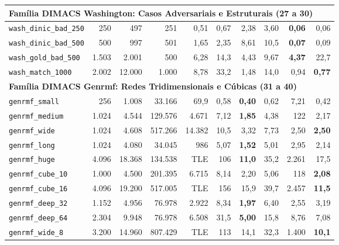 \begin{longtable}{lrrrrrrrrr}
\midrule
\multicolumn{10}{l}{\textbf{Família DIMACS Washington: Casos Adversariais e Estruturais (27 a 30)}} \\
\midrule
\texttt{wash\_dinic\_bad\_250} & 250 & 497 & 251 & 0,51 & 0,67 & 2,38 & 3,60 & \textbf{0,06} & 0,06 \\
\texttt{wash\_dinic\_bad\_500} & 500 & 997 & 501 & 1,65 & 2,35 & 8,61 & 10,5 & \textbf{0,07} & 0,09 \\
\texttt{wash\_gold\_bad\_500} & 1.503 & 2.001 & 500 & 6,28 & 14,3 & 4,43 & 9,67 & \textbf{4,37} & 22,7 \\
\texttt{wash\_match\_1000} & 2.002 & 12.000 & 1.000 & 8,78 & 33,2 & 1,48 & 14,0 & 0,94 & \textbf{0,77} \\
\midrule
\multicolumn{10}{l}{\textbf{Família DIMACS Genrmf: Redes Tridimensionais e Cúbicas (31 a 40)}} \\
\midrule
\texttt{genrmf\_small} & 256 & 1.008 & 33.166 & 69,9 & 0,58 & \textbf{0,40} & 0,62 & 7,21 & 0,42 \\
\texttt{genrmf\_medium} & 1.024 & 4.544 & 129.576 & 4.671 & 7,12 & \textbf{1,85} & 4,38 & 122 & 2,17 \\
\texttt{genrmf\_wide} & 1.024 & 4.608 & 517.266 & 14.382 & 10,5 & 3,32 & 7,73 & 2,50 & \textbf{2,50} \\
\texttt{genrmf\_long} & 1.024 & 4.080 & 34.045 & 986 & 5,07 & \textbf{1,52} & 5,01 & 2,95 & 2,14 \\
\texttt{genrmf\_huge} & 4.096 & 18.368 & 134.538 & TLE & 106 & \textbf{11,0} & 35,2 & 2.261 & 17,5 \\
\texttt{genrmf\_cube\_10} & 1.000 & 4.500 & 201.395 & 6.715 & 8,14 & 2,20 & 5,06 & 118 & \textbf{2,08} \\
\texttt{genrmf\_cube\_16} & 4.096 & 19.200 & 517.005 & TLE & 156 & 15,9 & 39,7 & 2.457 & \textbf{11,5} \\
\texttt{genrmf\_deep\_32} & 1.152 & 4.956 & 76.978 & 2.922 & 8,34 & \textbf{1,97} & 6,40 & 2,55 & 3,19 \\
\texttt{genrmf\_deep\_64} & 2.304 & 9.948 & 76.978 & 6.508 & 31,5 & \textbf{5,00} & 15,8 & 8,76 & 7,08 \\
\texttt{genrmf\_wide\_8} & 3.200 & 14.960 & 807.429 & TLE & 113 & 14,1 & 32,3 & 1.400 & \textbf{10,1} \\
\bottomrule
\end{longtable}
\endgroup
